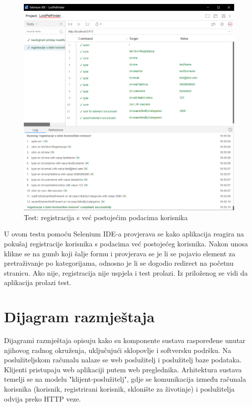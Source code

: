 \begin{figure}[!htb]
	\centering
	\includegraphics[width=\textwidth]{slike/selenium_test_2.png}
	\caption{Test: registracija s već postojećim podacima korisnika}
\end{figure}

U ovom testu pomoću Selenium IDE-a provjerava se kako aplikacija reagira na pokušaj registracije korisnika s podacima već postojećeg korisnika. Nakon unosa klikne se na gumb koji šalje formu i provjerava se je li se pojavio element za pretraživanje po kategorijama, odnosno je li se dogodio redirect na početnu stranicu. Ako nije, registracija nije uspjela i test prolazi. Iz priloženog se vidi da aplikacija prolazi test.

\eject


\section{Dijagram razmještaja}

\noindent Dijagrami razmještaja opisuju kako su komponente sustava raspoređene unutar njihovog radnog okruženja, uključujući sklopovlje i softversku podršku. Na poslužiteljskom računalu nalaze se web poslužitelj i poslužitelj baze podataka. Klijenti pristupaju web aplikaciji putem web preglednika. Arhitektura sustava temelji se na modelu "klijent-poslužitelj", gdje se komunikacija između računala korisnika (korisnik, registrirani korisnik, sklonište za životinje) i poslužitelja odvija preko HTTP veze.

